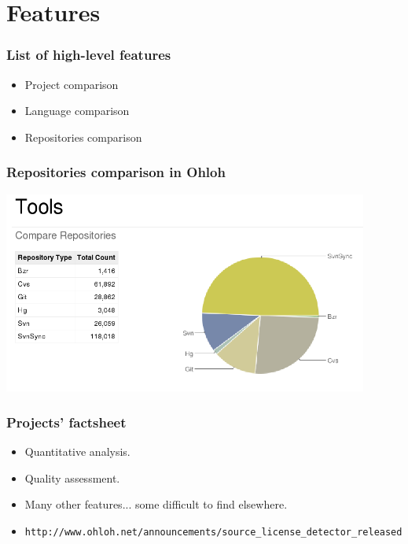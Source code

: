 \documentclass{beamer}
\begin{document}
\section{Features}

\begin{frame}
\frametitle{List of high-level features}
\begin{center}
\begin{itemize}
 \item Project comparison
 \item Language comparison
 \item Repositories comparison
\end{itemize}

\end{center}
\end{frame}

\begin{frame}
\frametitle{Repositories comparison in Ohloh}
\begin{center}
\includegraphics[width=0.9\textwidth]{figs/ohloh-repos-comparison.png}
\end{center}
\end{frame}

\begin{frame}
\frametitle{Projects' factsheet}
\begin{center}
\begin{itemize}
 \item Quantitative analysis.
 \item Quality assessment.
 \item Many other features... some difficult to find elsewhere.
 \item \scriptsize{\texttt{http://www.ohloh.net/announcements/source\_license\_detector\_released}}
\end{itemize}
\end{center}
\end{frame}
\end{document}
